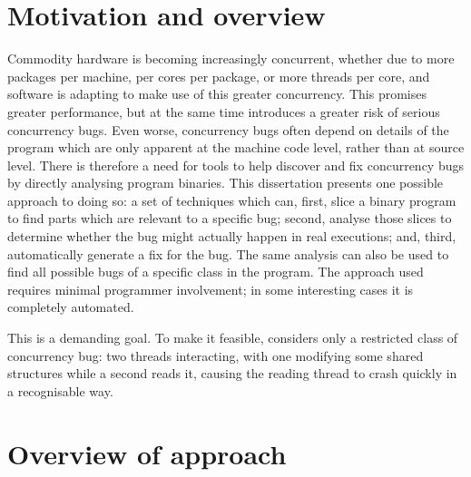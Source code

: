 


\section{Motivation and overview}

Commodity hardware is becoming increasingly concurrent, whether due to
more packages per machine, per cores per package, or more threads per
core, and software is adapting to make use of this greater
concurrency.  This promises greater performance, but at the same time
introduces a greater risk of serious concurrency bugs.  Even worse,
concurrency bugs often depend on details of the program which are only
apparent at the machine code level, rather than at source level.
There is therefore a need for tools to help discover and fix
concurrency bugs by directly analysing program binaries.  This
dissertation presents one possible approach to doing so: a set of
techniques which can, first, slice a binary program to find parts
which are relevant to a specific bug; second, analyse those slices to
determine whether the bug might actually happen in real executions;
and, third, automatically generate a fix for the bug.   The same analysis can also be used to find all possible bugs
of a specific class in the program.  The approach used requires
minimal programmer involvement; in some interesting cases it is
completely automated.

This is a demanding goal.  To make it feasible, {\technique} considers
only a restricted class of concurrency bug: two threads interacting,
with one modifying some shared structures while a second reads it,
causing the reading thread to crash quickly in a recognisable
way.

\section{Overview of approach}
\label{sect:intro:overview}

